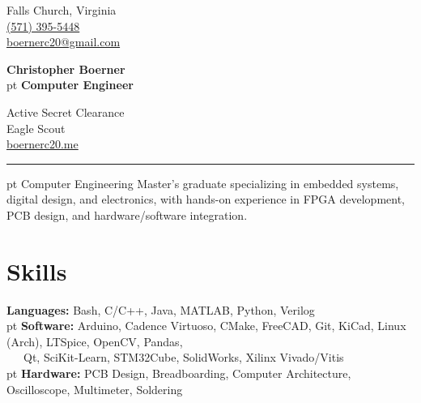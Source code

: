 \documentclass[9pt, letterpaper]{extarticle}
\newenvironment{twocolentry}[2][]{
    \onecolentry
    \def\secondColumn{#2}
    \setcolumnwidth{\fill, 4.5 cm}
    \begin{paracol}{2}
}{
    \switchcolumn \raggedleft \secondColumn
    \end{paracol}
    \endonecolentry
} %
\newenvironment{threecolentry}[3][]{
    \onecolentry
    \def\thirdColumn{#3}
    \setcolumnwidth{, \fill, \fill, \fill}
    \begin{paracol}{3}
    {\raggedright #2} \switchcolumn
    \begin{center}  %
}{
    \end{center}
    \switchcolumn \raggedleft \thirdColumn
    \end{paracol}
    \endonecolentry
} %
\let\hrefWithoutArrow\href
\begin{document}
    \newcommand{\AND}{\unskip
        \cleaders\copy\ANDbox\hskip\wd\ANDbox
        \ignorespaces
    }
    \newsavebox\ANDbox
    \sbox\ANDbox{$|$}
    \begin{threecolentry}
        {
            Falls Church, Virginia\\
            \hrefWithoutArrow{tel:+1-571-395-5448}{(571) 395-5448}\\
            \hrefWithoutArrow{mailto:boernerc20@gmail.com}{boernerc20@gmail.com}
        }
        {
            Active Secret Clearance \\
            Eagle Scout \\
            \hrefWithoutArrow{https://www.boernerc20.me}{boernerc20.me} \\
        }
        {
            \Huge\textbf{{Christopher Boerner}}\\
             pt%
            \Large{\textbf{Computer Engineer}}
        }
    \end{threecolentry}
    \hrule
     pt%
    Computer Engineering Master's graduate specializing in embedded systems, digital design, and electronics, with hands-on experience in FPGA development, PCB design, and hardware/software integration.

    \section{Skills}
    \textbf{Languages: }Bash, C/C++, Java, MATLAB, Python, Verilog\\
     pt%
    \textbf{Software: }Arduino, Cadence Virtuoso, CMake, FreeCAD, Git, KiCad, Linux (Arch), LTSpice, OpenCV, Pandas,\\
    \quad\quad\quad\quad\ \ \ Qt, SciKit-Learn, STM32Cube, SolidWorks, Xilinx Vivado/Vitis\\
     pt%
    \textbf{Hardware: }PCB Design, Breadboarding, Computer Architecture, Oscilloscope, Multimeter, Soldering\\ 
\end{document}
